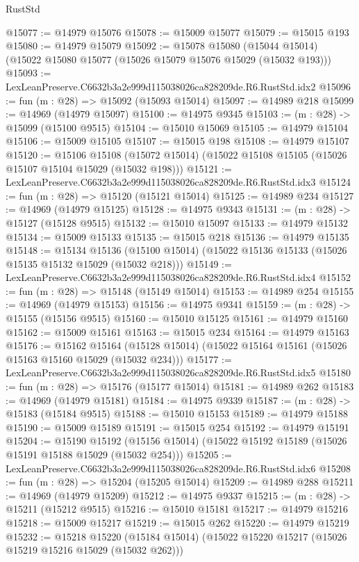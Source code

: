\begin{lexlean}{RustStd}
\begin{coremodule}
@15077 := @14979 @15076
@15078 := @15009 @15077
@15079 := @15015 @193
@15080 := @14979 @15079
@15092 := @15078
    @15080
    (@15044 @15014)
    (@15022 @15080 @15077 (@15026 @15079 @15076 @15029 (@15032 @193)))
@15093 := LexLeanPreserve.C6632b3a2e999d115038026ca828209de.R6.RustStd.idx2
@15096 := fun (m : @28) => @15092 (@15093 @15014)
@15097 := @14989 @218
@15099 := @14969 (@14979 @15097)
@15100 := @14975 @9345
@15103 := (m : @28) -> @15099 (@15100 @9515)
@15104 := @15010 @15069
@15105 := @14979 @15104
@15106 := @15009 @15105
@15107 := @15015 @198
@15108 := @14979 @15107
@15120 := @15106
    @15108
    (@15072 @15014)
    (@15022 @15108 @15105 (@15026 @15107 @15104 @15029 (@15032 @198)))
@15121 := LexLeanPreserve.C6632b3a2e999d115038026ca828209de.R6.RustStd.idx3
@15124 := fun (m : @28) => @15120 (@15121 @15014)
@15125 := @14989 @234
@15127 := @14969 (@14979 @15125)
@15128 := @14975 @9343
@15131 := (m : @28) -> @15127 (@15128 @9515)
@15132 := @15010 @15097
@15133 := @14979 @15132
@15134 := @15009 @15133
@15135 := @15015 @218
@15136 := @14979 @15135
@15148 := @15134
    @15136
    (@15100 @15014)
    (@15022 @15136 @15133 (@15026 @15135 @15132 @15029 (@15032 @218)))
@15149 := LexLeanPreserve.C6632b3a2e999d115038026ca828209de.R6.RustStd.idx4
@15152 := fun (m : @28) => @15148 (@15149 @15014)
@15153 := @14989 @254
@15155 := @14969 (@14979 @15153)
@15156 := @14975 @9341
@15159 := (m : @28) -> @15155 (@15156 @9515)
@15160 := @15010 @15125
@15161 := @14979 @15160
@15162 := @15009 @15161
@15163 := @15015 @234
@15164 := @14979 @15163
@15176 := @15162
    @15164
    (@15128 @15014)
    (@15022 @15164 @15161 (@15026 @15163 @15160 @15029 (@15032 @234)))
@15177 := LexLeanPreserve.C6632b3a2e999d115038026ca828209de.R6.RustStd.idx5
@15180 := fun (m : @28) => @15176 (@15177 @15014)
@15181 := @14989 @262
@15183 := @14969 (@14979 @15181)
@15184 := @14975 @9339
@15187 := (m : @28) -> @15183 (@15184 @9515)
@15188 := @15010 @15153
@15189 := @14979 @15188
@15190 := @15009 @15189
@15191 := @15015 @254
@15192 := @14979 @15191
@15204 := @15190
    @15192
    (@15156 @15014)
    (@15022 @15192 @15189 (@15026 @15191 @15188 @15029 (@15032 @254)))
@15205 := LexLeanPreserve.C6632b3a2e999d115038026ca828209de.R6.RustStd.idx6
@15208 := fun (m : @28) => @15204 (@15205 @15014)
@15209 := @14989 @288
@15211 := @14969 (@14979 @15209)
@15212 := @14975 @9337
@15215 := (m : @28) -> @15211 (@15212 @9515)
@15216 := @15010 @15181
@15217 := @14979 @15216
@15218 := @15009 @15217
@15219 := @15015 @262
@15220 := @14979 @15219
@15232 := @15218
    @15220
    (@15184 @15014)
    (@15022 @15220 @15217 (@15026 @15219 @15216 @15029 (@15032 @262)))

\end{coremodule}
\end{lexlean}
